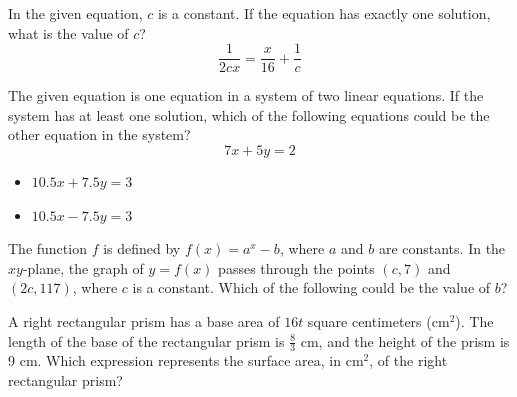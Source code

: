 \vspace{2em}
\newpage

\noindent\markforreview
\vspace{1em}

In the given equation, \(c\) is a constant.
If the equation has exactly one solution, what is the value of \(c\)?
\[
\frac{1}{2cx} = \frac{x}{16} + \frac{1}{c}
\]

\vspace{2em}
\newpage

\noindent\markforreview
\vspace{1em}

The given equation is one equation in a system of two linear equations.
If the system has at least one solution, which of the following equations could be the other equation in the system?
\[
7x + 5y = 2
\]

\begin{itemize}
\item[I] \(10.5x + 7.5y = 3\)
\item[II] \(10.5x - 7.5y = 3\)
\end{itemize}

\vspace{0.75em}


\vspace{2em}
\newpage

\noindent\markforreview
\vspace{1em}

The function \(f\) is defined by \(f(x) = a^{x} - b\), where \(a\) and \(b\) are constants.
In the \(xy\)-plane, the graph of \(y = f(x)\) passes through the points \((c, 7)\) and \((2c, 117)\), where \(c\) is a constant.
Which of the following could be the value of \(b\)?

\vspace{2em}
\newpage

\noindent\markforreview
\vspace{1em}

A right rectangular prism has a base area of \(16t\) square centimeters (\(\text{cm}^2\)).
The length of the base of the rectangular prism is \(\frac{8}{3}\) cm, and the height of the prism is 9 cm.
Which expression represents the surface area, in \(\text{cm}^2\), of the right rectangular prism?

\vspace{2em}
\newpage

